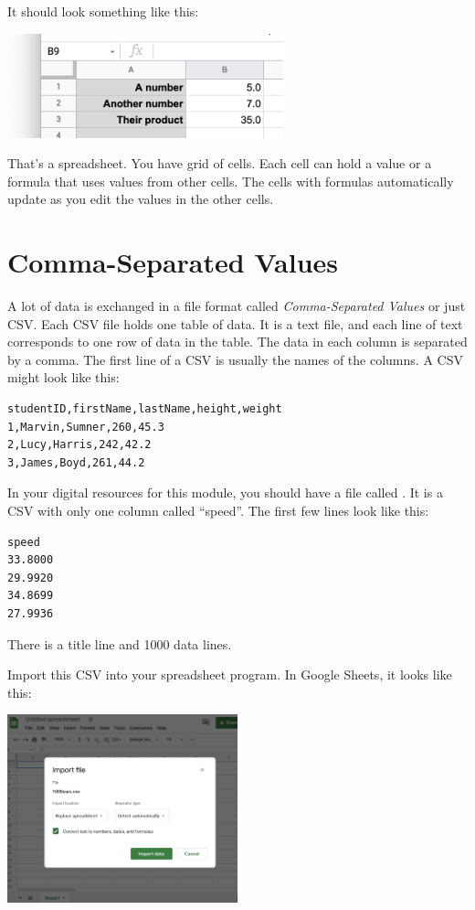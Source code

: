 It should look something like this:

\includegraphics[width=0.6\textwidth]{FirstFormatting.png}

That's a spreadsheet. You have grid of cells. Each cell can hold a
value or a formula that uses values from other cells.  The cells with
formulas automatically update as you edit the values in the other
cells.

\section{Comma-Separated Values}

A lot of data is exchanged in a file format called
\textit{Comma-Separated Values} or just CSV. Each CSV file holds one
table of data. It is a text file, and each line of text corresponds to
one row of data in the table. The data in each column is separated by
a comma. The first line of a CSV is usually the names of the
columns. A CSV might look like this:

\begin{Verbatim}
studentID,firstName,lastName,height,weight
1,Marvin,Sumner,260,45.3
2,Lucy,Harris,242,42.2
3,James,Boyd,261,44.2
\end{Verbatim}

In your digital resources for this module, you should have a file
called . It is a CSV with only one column called
``speed''. The first few lines look like this:

\begin{Verbatim}
speed
33.8000
29.9920
34.8699
27.9936
\end{Verbatim}

There is a title line and 1000 data lines.

Import this CSV into your spreadsheet program. In Google Sheets, it looks like this:

\includegraphics[width=0.5\textwidth]{ImportingCSV.png}

